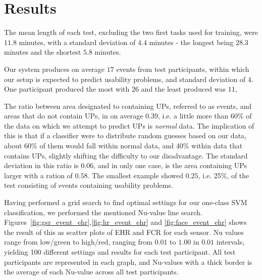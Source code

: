 \section{Results}
The mean length of each test, excluding the two first tasks used for training, were $11.8$ minutes, with a standard
deviation of $4.4$ minutes - the longest being $28.3$ minutes and the shortest $5.8$ minutes.

Our system produces on average $17$ events from test participants, within which our setup is expected to predict
usability problems, and standard deviation of $4$. One participant produced the most with $26$ and the least produced
was $11$,

The ratio between area designated to containing UPs, referred to as events, and areas that do not contain UPs, in on
average $0.39$, i.e. a little more than 60\% of the data on which we attempt to predict UPs is \textit{normal} data. The
implication of this is that if a classifier were to distribute random guesses based on our data, about 60\% of them
would fall within normal data, and 40\% within data that contains UPs, slightly shifting the difficulty to our
disadvantage. The standard deviation in this ratio is $0.06$, and in only one case, is the area containing UPs larger
with a ration of $0.58$. The smallest example showed $0.25$, i.e. 25\%, of the test consisting of events containing
usability problems.



Having performed a grid search to find optimal settings for our one-class SVM classification, we performed the mentioned
Nu-value line search. Figures~\ref{fig:gsr_event_ehr},\ref{fig:hr_event_ehr} and \ref{fig:face_event_ehr}
shows the result of this as scatter plots of EHR and FCR for each sensor. Nu values range from low/green to high/red,
ranging from $0.01$ to $1.00$ in $0.01$ intervals, yielding 100 different settings and results for each test
participant. All test participants are represented in each graph, and Nu-values with a thick border is the average of
each Nu-value across all test participants.

